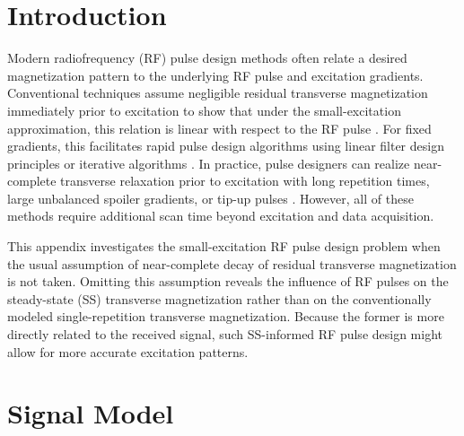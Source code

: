 
\section{Introduction}
\label{s,ss-rf,intro}

Modern radiofrequency (RF) pulse design methods 
often relate a desired magnetization pattern 
to the underlying RF pulse and excitation gradients. 
Conventional techniques assume
negligible residual transverse magnetization 
immediately prior to excitation 
to show that under the small-excitation approximation, 
this relation is linear with respect to the RF pulse \cite{pauly:89:aks}. 
For fixed gradients, 
this facilitates rapid pulse design algorithms 
using linear filter design principles \cite{shinnar:89:tuo, pauly:91:prf} 
or iterative algorithms \cite{yip:05:irp, setsompop:08:mls}. 
In practice, 
pulse designers can realize 
near-complete transverse relaxation 
prior to excitation with long repetition times, 
large unbalanced spoiler gradients, 
or tip-up pulses \cite{nielsen:13:stf}. 
However, all of these methods require additional scan time 
beyond excitation and data acquisition. 

This appendix investigates 
the small-excitation RF pulse design problem 
when the usual assumption of near-complete decay 
of residual transverse magnetization is not taken.
Omitting this assumption
reveals the influence of RF pulses
on the steady-state (SS) transverse magnetization
rather than on the conventionally modeled 
single-repetition transverse magnetization.
Because the former is more directly related
to the received signal,
such SS-informed RF pulse design
might allow for more accurate excitation patterns.

\section{Signal Model}
\label{s,ss-rf,model}

